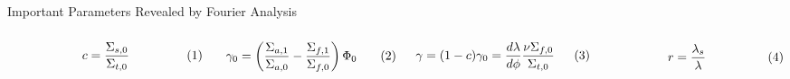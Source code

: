 \begin{frame}{Important Parameters Revealed by Fourier Analysis}
\begin{subequations}
\begin{minipage}{.45\linewidth}
\centering
\begin{equation}
  c=\frac{\Sigma_{s,0}}{\Sigma_{t,0}}
\end{equation}
\end{minipage}%
\begin{minipage}{.45\linewidth}
\centering
\begin{equation}
  \gamma_0= \left(\frac{\Sigma_{a,1}}{\Sigma_{a,0}} - \frac{ \Sigma_{f,1}}{\Sigma_{f,0}}\right) \Phi_0
\end{equation}
\end{minipage}\\
\vspace{-1em}
\noindent\begin{minipage}{.45\linewidth}
\centering
\begin{equation}
  \gamma=(1-c)\gamma_0=\frac{d\lambda}{d\phi}\frac{\nu\Sigma_{f,0}}{{\Sigma_{t,0}}}
\end{equation}
\end{minipage}%
\begin{minipage}{.45\linewidth}
\centering
\begin{equation}
  r=\frac{\lambda_s}{\lambda}
\end{equation}
\end{minipage}
\end{subequations}

\vfill
\end{frame}

